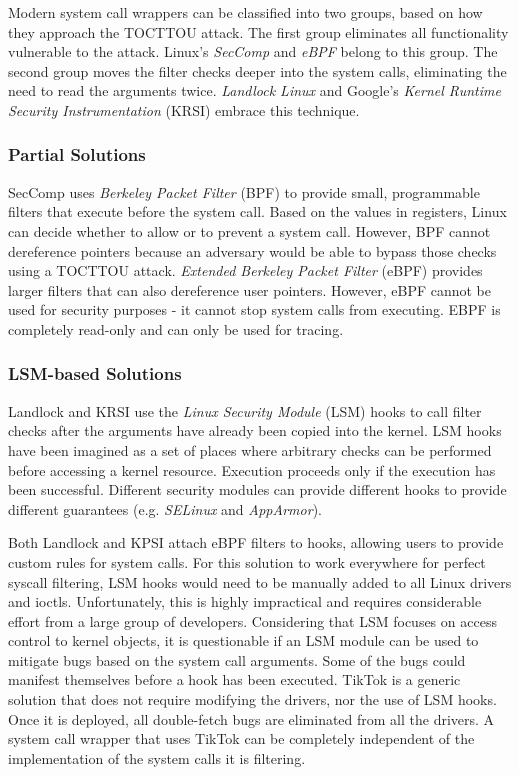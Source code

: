 Modern system call wrappers can be classified into two groups, based on how they
approach the TOCTTOU attack. The first group eliminates all functionality
vulnerable to the attack. Linux's \emph{SecComp}\cite{seccomp} and
\emph{eBPF}\cite{ebpf} belong to this group. The second group moves the filter
checks deeper into the system calls, eliminating the need to read the arguments
twice. \emph{Landlock Linux} \cite{landlock} and Google's \emph{Kernel Runtime
Security Instrumentation} (KRSI)\cite{krsi} embrace this technique.

\subsubsection{Partial Solutions}
SecComp\cite{seccomp} uses \emph{Berkeley Packet Filter} (BPF) to provide small,
programmable filters that execute before the system call. Based on the values
in registers, Linux can decide whether to allow or to prevent a system call.
However, BPF cannot dereference pointers because an adversary would be able to
bypass those checks using a TOCTTOU attack. \emph{Extended Berkeley Packet
Filter} (eBPF)\cite{ebpf} provides larger filters that can also dereference
user pointers. However, eBPF cannot be used for security purposes - it cannot
stop system calls from executing. EBPF is completely read-only and can only be
used for tracing.

\subsubsection{LSM-based Solutions}
Landlock\cite{landlock} and KRSI\cite{krsi} use the \emph{Linux Security Module}
\cite{morris2002linux} (LSM) hooks to call filter checks after the arguments
have already been copied into the kernel. LSM hooks have been imagined as a set
of places where arbitrary checks can be performed before accessing a kernel
resource. Execution proceeds only if the execution has been successful.
Different security modules can provide different hooks to provide different
guarantees (e.g. \emph{SELinux}\cite{smalley2001implementing} and
\emph{AppArmor}\cite{gruenbacher2007apparmor}).

Both Landlock and KPSI attach eBPF filters to hooks, allowing users to provide
custom rules for system calls. For this solution to work everywhere for perfect
syscall filtering, LSM hooks would need to be manually added to all Linux
drivers and ioctls. Unfortunately, this is highly impractical and requires
considerable effort from a large group of developers. Considering that LSM
focuses on access control to kernel objects, it is questionable if an LSM module
can be used to mitigate bugs based on the system call arguments. Some of the
bugs could manifest themselves before a hook has been executed. TikTok is a
generic solution that does not require modifying the drivers, nor the use of
LSM hooks. Once it is deployed, all double-fetch bugs are eliminated from all
the drivers. A system call wrapper that uses TikTok can be completely
independent of the implementation of the system calls it is filtering.


